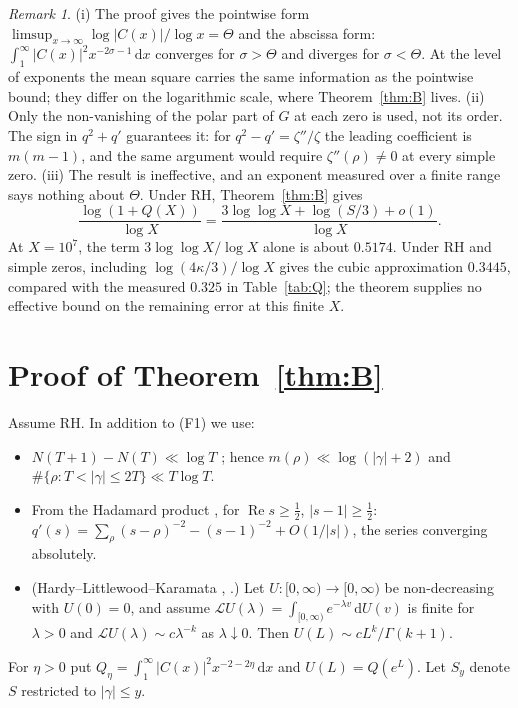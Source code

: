 \documentclass[11pt]{amsart}
\theoremstyle{remark}
\newtheorem{remark}[lemma]{Remark}
\theoremstyle{definition}
\newcommand{\dd}{\,\mathrm{d}}
\renewcommand{\Re}{\operatorname{Re}}
\begin{document}
\begin{remark}\label{rem:A}
(i) The proof gives the pointwise form $\limsup_{x\to\infty}\log|C(x)|/\log x=\Theta$ and the abscissa form: $\int_1^\infty|C(x)|^2x^{-2\sigma-1}\dd x$ converges for $\sigma>\Theta$ and diverges for $\sigma<\Theta$. At the level of exponents the mean square carries the same information as the pointwise bound; they differ on the logarithmic scale, where Theorem~\ref{thm:B} lives.
(ii) Only the non-vanishing of the polar part of $G$ at each zero is used, not its order. The sign in $q^2+q'$ guarantees it: for $q^2-q'=\zeta''/\zeta$ the leading coefficient is $m(m-1)$, and the same argument would require $\zeta''(\rho)\ne0$ at every simple zero.
(iii) The result is ineffective, and an exponent measured over a finite range says nothing about $\Theta$. Under RH, Theorem~\ref{thm:B} gives
\[
\frac{\log(1+Q(X))}{\log X}
=\frac{3\log\log X+\log(S/3)+o(1)}{\log X}.
\]
At $X=10^7$, the term $3\log\log X/\log X$ alone is about $0.5174$. Under RH and simple zeros, including $\log(4\kappa/3)/\log X$ gives the cubic approximation $0.3445$, compared with the measured $0.325$ in Table~\ref{tab:Q}; the theorem supplies no effective bound on the remaining error at this finite $X$.
\end{remark}

\section{Proof of Theorem~\ref{thm:B}}\label{sec:B}

Assume RH. In addition to (F1) we use:
\begin{itemize}
\item[(F3)] $N(T+1)-N(T)\ll\log T$ \cite[Thm.~9.2]{Tit86}; hence $m(\rho)\ll\log(|\gamma|+2)$ and $\#\{\rho:T<|\gamma|\le2T\}\ll T\log T$.
\item[(F4)] From the Hadamard product \cite[Ch.~12]{Dav00}, for $\Re s\ge\frac12$, $|s-1|\ge\frac12$: $q'(s)=\sum_\rho(s-\rho)^{-2}-(s-1)^{-2}+O(1/|s|)$, the series converging absolutely.
\item[(F5)] (Hardy--Littlewood--Karamata \cite[Ch.~V]{Wid41}, \cite[Ch.~I]{Kor04}.) Let $U:[0,\infty)\to[0,\infty)$ be non-decreasing with $U(0)=0$, and assume $\mathcal LU(\lambda)=\int_{[0,\infty)}e^{-\lambda v}\dd U(v)$ is finite for $\lambda>0$ and $\mathcal LU(\lambda)\sim c\lambda^{-k}$ as $\lambda\downarrow0$. Then $U(L)\sim cL^k/\Gamma(k+1)$.
\end{itemize}

For $\eta>0$ put $Q_\eta=\int_1^\infty|C(x)|^2x^{-2-2\eta}\dd x$ and $U(L)=Q(e^L)$. Let $S_y$ denote $S$ restricted to $|\gamma|\le y$.
\end{document}

